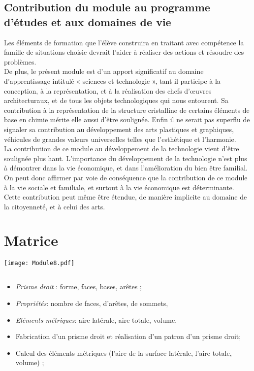 \subsection{Contribution du module au programme d'études et aux domaines de vie}
Les éléments de formation que l'élève construira en traitant avec compétence la famille de situations choisie devrait l'aider à réaliser des actions et résoudre des problèmes.\\
De plus, le présent module est d'un apport significatif au domaine d'apprentissage intitulé « sciences et technologie », tant il participe à la conception, à la représentation, et à la réalisation des chefs d'œuvres architecturaux, et de tous les objets technologiques qui nous entourent. Sa contribution à la représentation
de la structure cristalline de certains éléments de base en chimie mérite elle aussi d'être soulignée. Enfin il ne serait pas superflu de signaler sa contribution au développement des arts plastiques et graphiques, véhicules de grandes valeurs universelles telles que l'esthétique et l'harmonie.\\
La contribution de ce module au développement de la technologie vient d'être soulignée plus haut. L'importance du développement de la technologie n'est plus à démontrer dans la vie économique, et dans l'amélioration du bien être familial. On peut donc affirmer par voie de conséquence que la contribution de ce module à la vie sociale et familiale, et surtout à la vie économique est déterminante. Cette contribution peut même être étendue, de manière implicite au domaine de la citoyenneté, et à celui des arts.

\section{Matrice}

\texttt{[image: Module8.pdf]} 

\subsection*{}

\savoir
\begin{itemize}
\item \textit{Prisme droit} : forme, faces, bases, arêtes ;
\item \textit{Propriétés}: nombre de faces, d'arêtes, de sommets,
\item \textit{Eléments métriques}: aire latérale, aire totale, volume.
\end{itemize}
\savoirfaire
\begin{itemize}
\item Fabrication d'un prisme droit et réalisation d'un patron d'un prisme droit;
\item Calcul des éléments métriques (l'aire de la surface latérale, l'aire
totale, volume) ;
\end{itemize}

